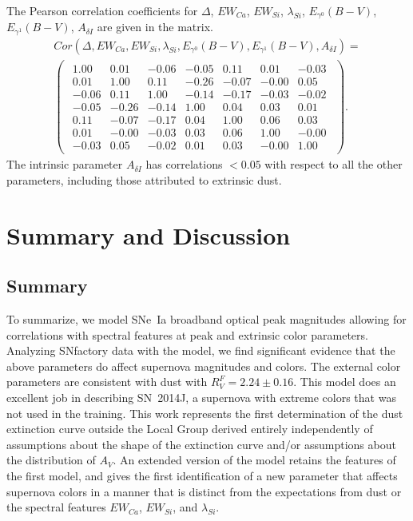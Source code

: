 \documentclass{aastex61}   	%
\begin{document}
The Pearson correlation coefficients for $\Delta$, $EW_{Ca}$, $EW_{Si}$, $\lambda_{Si}$, $E_{\gamma^0}(B-V)$, $E_{\gamma^1}(B-V)$,  $A_{\delta I}$ are given in the matrix.
\begin{multline}
Cor(\Delta, EW_{Ca}, EW_{Si}, \lambda_{Si}, E_{\gamma^0}(B-V), E_{\gamma^1}(B-V),  A_{\delta I}) =\\
\begin{pmatrix}
\begin{array}{rrrrrrr}
1.00 & 0.01 & -0.06 & -0.05 & 0.11 & 0.01 & -0.03 \\
0.01 & 1.00 & 0.11 & -0.26 & -0.07 & -0.00 & 0.05 \\
-0.06 & 0.11 & 1.00 & -0.14 & -0.17 & -0.03 & -0.02 \\
-0.05 & -0.26 & -0.14 & 1.00 & 0.04 & 0.03 & 0.01 \\
0.11 & -0.07 & -0.17 & 0.04 & 1.00 & 0.06 & 0.03 \\
0.01 & -0.00 & -0.03 & 0.03 & 0.06 & 1.00 & -0.00 \\
-0.03 & 0.05 & -0.02 & 0.01 & 0.03 & -0.00 & 1.00
\end{array}
\end{pmatrix}.
\end{multline}
\color{red}
The intrinsic parameter $A_{\delta I}$ has correlations $<0.05$ with respect to all the other parameters, including those attributed
to extrinsic dust.


\section{Summary and Discussion}
\label{discussion:sec}
\subsection{Summary}
To summarize, we model SNe~Ia broadband optical peak magnitudes allowing for correlations with spectral features at peak and
extrinsic color parameters.  Analyzing SNfactory data with the model, we find significant evidence that the above parameters do
affect supernova magnitudes and colors.  The external color parameters are consistent with \citet{1999PASP..111...63F} dust
with $R^F_V=2.24 \pm 0.16$.  This model  does an excellent job in
describing SN~2014J, a supernova with extreme colors that was not used in the training.  
This work represents the first determination of the dust extinction curve outside the Local Group
derived entirely independently of assumptions about the shape of the extinction curve and/or assumptions about the
distribution of $A_V$.  An extended version
of the model retains the features of the first model, and gives the first identification of  a new parameter that affects supernova
colors in a manner that is distinct from  the expectations from dust or the spectral features $EW_{Ca}$, $EW_{Si}$, and $\lambda_{Si}$.
\end{document}
